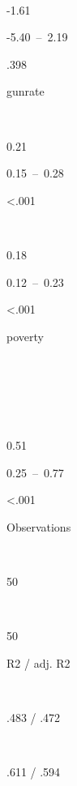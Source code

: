 \documentclass[floatsintext,mask,man]{apa6}
\theoremstyle{definition}
\theoremstyle{definition}
\theoremstyle{definition}
\theoremstyle{remark}
\begin{document}
~

-1.61

-5.40~--~2.19

.398

gunrate

~

0.21

0.15~--~0.28

\textless{}.001

~

0.18

0.12~--~0.23

\textless{}.001

poverty

~

~

~

0.51

0.25~--~0.77

\textless{}.001

Observations

~

50

~

50

R2 / adj. R2

~

.483 / .472

~

.611 / .594
\end{document}
